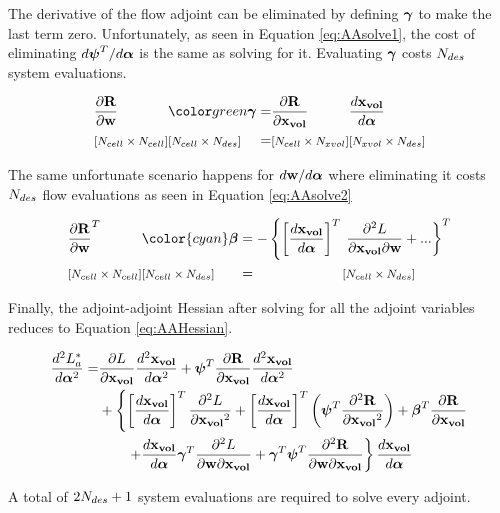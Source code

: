 \documentclass[letterpaper,12pt,]{article}
\begin{document}
The derivative of the flow adjoint can be eliminated by defining $\boldsymbol{\gamma}$ to make the last term zero.
Unfortunately, as seen in Equation \ref{eq:AAsolve1}, the cost of eliminating $d\boldsymbol{\psi}^T/d\boldsymbol{\alpha}$ is the same as solving for it.
Evaluating $\boldsymbol{\gamma}$ costs $N_{des}$ system evaluations.

\begin{equation}
\begin{alignedat}{5}
	&\del{\bR}{\bw}
	&&\green{\bgam}
	&&=
	&&\del{\bR}{\xvol}
	&&\Dt{\xvol}{\balfa}
	\\
	& \nxn{\ncell}{\ncell}
	&&\nxn{\ncell}{\ndes}
	&&=
	&&\nxn{\ncell}{\nxvol}
	&&\nxn{\nxvol}{\ndes}
\label{eq:AAsolve1}
\end{alignedat}
\end{equation}

The same unfortunate scenario happens for $d\mathbf{w}/d\boldsymbol{\alpha}$ where eliminating it costs $N_{des}$ flow evaluations as seen in Equation \ref{eq:AAsolve2}

\begin{equation}
\begin{alignedat}{5}
	&\del{\bR}{\bw}^T
	&&{\color{cyan}\bbeta}
	&&= -
	\left\{
	\trans{\Dt{\xvol}{\balfa}}
	\right. && \left.
	\ddelm{L}{\xvol}{\bw}
	+ ...
	\right\}^T
	\\
	& \nxn{\ncell}{\ncell}
	&&\nxn{\ncell}{\ndes}
	&&=
	&&\nxn{\ncell}{\ndes}
\label{eq:AAsolve2}
\end{alignedat}
\end{equation}

Finally, the adjoint-adjoint Hessian after solving for all the adjoint variables reduces to Equation \ref{eq:AAHessian}.

\begin{equation}
\begin{split}
	\dfrac{d^2L_a^*}{d\boldsymbol{\alpha}^2} = 
	&
	\dfrac{\partial L}{\partial\mathbf{x_{vol}}}
	\dfrac{d^2\mathbf{x_{vol}}}{d\boldsymbol{\alpha}^2}
	+
	\boldsymbol{\psi}^T
	\dfrac{\partial\mathbf{R}}{\partial\mathbf{x_{vol}}}
	\dfrac{d^2\mathbf{x_{vol}}}{d\boldsymbol{\alpha}^2}
	\\&
	+
	\left\{
		\left[\dfrac{d\mathbf{x_{vol}}}{d\boldsymbol{\alpha}}\right]^{T}
		\dfrac{\partial^2L}{\partial\mathbf{x_{vol}}^2}
		+
		\left[\dfrac{d\mathbf{x_{vol}}}{d\boldsymbol{\alpha}}\right]^{T}
		\left(
		\boldsymbol{\psi}^T
		\dfrac{\partial^2\mathbf{R}}{\partial\mathbf{x_{vol}}^2}
		\right)
		+
		\boldsymbol{\beta}^T
			\dfrac{\partial\mathbf{R}}{\partial\mathbf{x_{vol}}}
		\right.\\&\left. \quad\quad
		+
		\dfrac{d\mathbf{x_{vol}}}{d\boldsymbol{\alpha}}
		\boldsymbol{\gamma}^T
		\dfrac{\partial^2L}{\partial\mathbf{w} \partial\mathbf{x_{vol}}}
		+
		\boldsymbol{\gamma}^T
		\boldsymbol{\psi}^T \dfrac{\partial^2\mathbf{R}}{\partial\mathbf{w} \partial\mathbf{x_{vol}}}
	\right\}
	\dfrac{d\mathbf{x_{vol}}}{d\boldsymbol{\alpha}}
\label{eq:AAHessian}
\end{split}
\end{equation}

A total of $2N_{des} + 1$ system evaluations are required to solve every adjoint.
\end{document}
